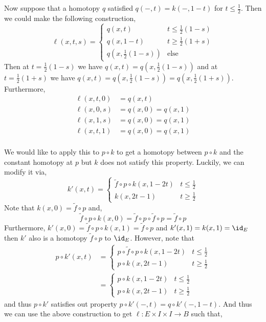 \documentclass[12pt]{extarticle}
\begin{document}
Now suppose that a homotopy $q$ satisfied $q(-, t) = k(-, 1-t)$ for $t \le \tfrac{1}{2}$. Then we could make the following construction,
\[ \ell(x, t, s) =
\begin{cases}
q(x, t) & t \le \tfrac{1}{2}(1 - s)
\\
q(x, 1-t) & t \ge \tfrac{1}{2}(1 + s)
\\
q(x, \tfrac{1}{2}(1-s)) & \text{else}
\end{cases} \]
Then at $t = \tfrac{1}{2}(1 - s)$ we have $q(x, t) = q(x, \tfrac{1}{2}(1 - s))$ and at $t = \tfrac{1}{2}(1 + s)$ we have $q(x, t) = q(x, \tfrac{1}{2}(1 - s)) = q(x, \tfrac{1}{2}(1 + s))$. Furthermore, 
\begin{align*}
\ell(x, t, 0) & = q(x, t)
\\
\ell(x, 0, s) & = q(x, 0) = q(x, 1)
\\
\ell(x, 1, s) & = q(x, 0) = q(x, 1)
\\
\ell(x, t, 1) & = q(x, 0) = q(x, 1)
\end{align*}
\bigskip\\
We would like to apply this to $p \circ k$ to get a homotopy between $p \circ k$ and the constant homotopy at $p$ but $k$ does not satisfy this property. Luckily, we can modify it via,
\[ k'(x, t) = 
\begin{cases}
\tilde{f} \circ p \circ k(x, 1-2t) & t \le \tfrac{1}{2}
\\
k(x, 2t-1) & t \ge \tfrac{1}{2} 
\end{cases} \]
Note that $k(x, 0) = \tilde{f} \circ p$ and,
\[ \tilde{f} \circ p \circ k(x, 0) = \tilde{f} \circ p \circ \tilde{f} \circ p = \tilde{f} \circ p \]
Furthermore, $k'(x,0) = \tilde{f} \circ p \circ k(x,1) = \tilde{f} \circ p$ and $k'(x, 1) = k(x, 1) = \id_E$ then $k'$ also is a homotopy $\tilde{f} \circ p$ to $\id_E$. 
However, note that
\begin{align*}
p \circ k'(x, t) & = 
\begin{cases}
p \circ \tilde{f} \circ p \circ k(x, 1-2t) & t \le \tfrac{1}{2}
\\
p \circ k(x, 2t-1) & t \ge \tfrac{1}{2} 
\end{cases}
\\ & =
\begin{cases}
p \circ k(x, 1-2t) & t \le \tfrac{1}{2}
\\
p \circ k(x, 2t-1) & t \ge \tfrac{1}{2} 
\end{cases}
\end{align*}
and thus $p \circ k'$ satisfies out property $p \circ k'(-, t) = q \circ k'(-, 1 - t)$. And thus we can use the above construction to get $\ell : E \times I \times I \to B$ such that,
\end{document}
